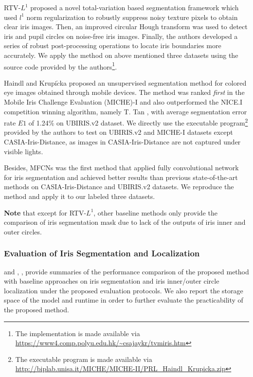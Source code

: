 \documentclass[journal]{IEEEtran}
\begin{document}
RTV-$L^1$\cite{Zhao2015An} proposed a novel total-variation based segmentation framework which used $l^1$ norm regularization to robustly suppress noisy texture pixels to obtain clear iris images. Then, an improved circular Hough transform was used to detect iris and pupil circles on noise-free iris images.
Finally, the authors developed a series of robust post-processing operations to locate iris boundaries more accurately.
We apply the method on above mentioned three datasets using the source code provided by the authors\footnote{The implementation is made available via \url{https://www4.comp.polyu.edu.hk/~csajaykr/tvmiris.htm}}.

Haindl and Krupi$\check{c}$ka\cite{haindl2015unsupervised} proposed an unsupervised segmentation method for colored eye images obtained through mobile devices. The method was ranked \emph{first} in the Mobile Iris Challenge Evaluation (MICHE)-I\cite{de2015mobile} and also outperformed the NICE.I competition winning algorithm, namely T. Tan \etal\cite{tan2010efficient}, with average segmentation error rate $E1$ of 1.24\% on UBIRIS.v2 dataset.
We directly use the executable program\footnote{The executable program is made available via \url{http://biplab.unisa.it/MICHE/MICHE-II/PRL_Haindl_Krupicka.zip}} provided by the authors to test on UBIRIS.v2 and MICHE-I datasets except CASIA-Iris-Distance, as images in CASIA-Iris-Distance are not captured under visible lights.

Besides, MFCNs\cite{liu2016accurate} was the first method that applied fully convolutional network for iris segmentation and achieved better results than previous state-of-the-art methods on CASIA-Iris-Distance and UBIRIS.v2 datasets. We reproduce the method and apply it to our labeled three datasets.

\textbf{Note} that except for RTV-$L^1$, other baseline methods only provide the comparison of iris segmentation mask due to lack of the outputs of iris inner and outer circles.

\subsubsection{Evaluation of Iris Segmentation and Localization}
\label{sec::preprocess_eval}
 and , ,  provide summaries of the performance comparison of the proposed method with baseline approaches on iris segmentation and iris inner/outer circle localization under the proposed evaluation protocols.  We also report the storage space of the model and runtime in order to further evaluate the practicability of the proposed method.
\end{document}
